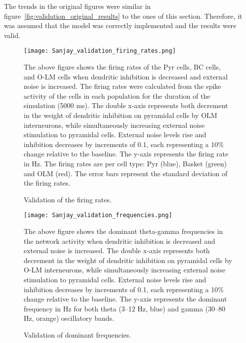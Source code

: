 The trends in the original figures were similar in figure~\ref{fig:validation_original_results} to the ones of this section.
Therefore, it was assumed that the model was correctly implemented and the results were valid.

\begin{figure}[htbp]
    \centering
    \texttt{[image: Sanjay\_validation\_firing\_rates.png]}
    \caption[Validation of the firing rates]{Validation of the firing rates.}\label{fig:validation_firing_rates}
    \begin{minipage}{0.9\textwidth}
        The above figure shows the firing rates of the Pyr cells, BC cells, and O-LM cells when dendritic inhibition is decreased and external noise is increased.
        The firing rates were calculated from the spike activity of the cells in each population for the duration of the simulation (5000 ms).
        The double x-axis represents both decrement in the weight of dendritic inhibition on pyramidal cells by OLM interneurons,
        while simultaneously increasing external noise stimulation to pyramidal cells.
        External noise levels rise and inhibition decreases by increments of 0.1, each representing a 10\% change relative to the baseline.
        The y-axis represents the firing rate in Hz.
        The firing rates are per cell type: Pyr (blue), Basket (green) and OLM (red).
        The error bars represent the standard deviation of the firing rates.
    \end{minipage}
\end{figure}

\begin{figure}[htbp]
    \centering
    \texttt{[image: Sanjay\_validation\_frequencies.png]}
    \caption[Validation of the firing rates]{Validation of dominant frequencies.}\label{fig:validation_frequencies}
    \begin{minipage}{0.9\textwidth}
        The above figure shows the dominant theta-gamma frequencies in the network activity when dendritic inhibition is decreased and external noise is increased.
        The double x-axis represents both decrement in the weight of dendritic inhibition on pyramidal cells by O-LM interneurons,
        while simultaneously increasing external noise stimulation to pyramidal cells.
        External noise levels rise and inhibition decreases by increments of 0.1, each representing a 10\% change relative to the baseline.
        The y-axis represents the dominant frequency in Hz for both theta (3--12 Hz, blue) and gamma (30--80 Hz, orange) oscillatory bands.
    \end{minipage}
\end{figure}

